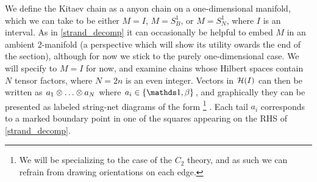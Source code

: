 We define the Kitaev chain as a anyon chain on a one-dimensional manifold, which we can take to be 
either $M = I$, $M= S^1_B$, or $M = S^1_N$, 
where $I$ is an interval. 
As in \eqref{strand_decomp} it can occasionally be helpful to embed $M$ in 
an ambient 2-manifold (a perspective which will show its utility owards the end of the section), although for now we stick to the purely one-dimensional case. 
We will specify to $M= I$ for now, and examine 
chains whose Hilbert spaces contain $N$ tensor factors, where $N=2n$ is an even integer. 
Vectors in $\mathcal{H}(I)$ can then be written as $a_1\tp\dots\tp a_N$ where $a_i \in \{\unit,\beta\}$, and graphically 
they can be presented as labeled string-net diagrams of the form \footnote{We will be specializing to the case of the $C_2$ theory, and as such we can
refrain from drawing orientations on each edge.}
\be  \label{graphical_MPS_state}
.
\ee
Each tail $a_i$ corresponds to a marked boundary point in one of the squares appearing on the RHS of \eqref{strand_decomp}. 

